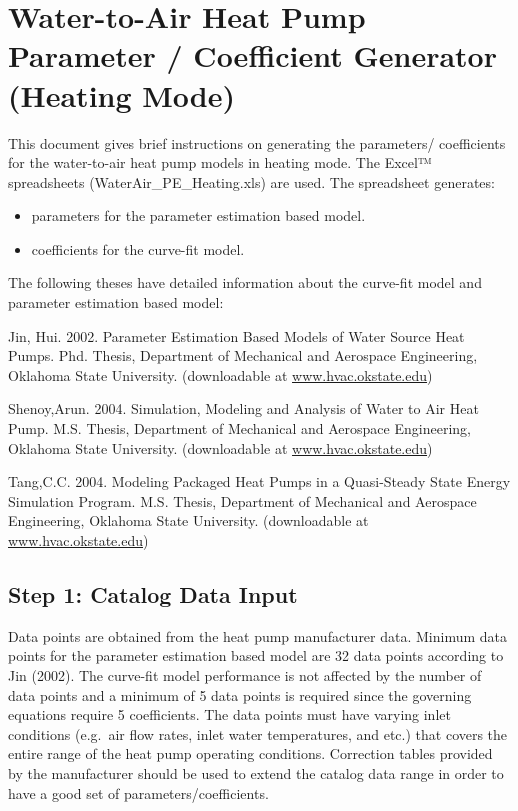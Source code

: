 \section{Water-to-Air Heat Pump Parameter / Coefficient Generator (Heating Mode)}\label{water-to-air-heat-pump-parameter-coefficient-generator-heating-mode}

This document gives brief instructions on generating the parameters/ coefficients for the water-to-air heat pump models in heating mode. The Excel™ spreadsheets (WaterAir\_PE\_Heating.xls) are used. The spreadsheet generates:

\begin{itemize}
\item
  parameters for the parameter estimation based model.
\item
  coefficients for the curve-fit model.
\end{itemize}

The following theses have detailed information about the curve-fit model and parameter estimation based model:

Jin, Hui. 2002. Parameter Estimation Based Models of Water Source Heat Pumps. Phd. Thesis, Department of Mechanical and Aerospace Engineering, Oklahoma State University. (downloadable at \href{http://www.hvac.okstate.edu}{www.hvac.okstate.edu})

Shenoy,Arun. 2004. Simulation, Modeling and Analysis of Water to Air Heat Pump. M.S. Thesis, Department of Mechanical and Aerospace Engineering, Oklahoma State University. (downloadable at \href{http://www.hvac.okstate.edu}{www.hvac.okstate.edu})

Tang,C.C. 2004. Modeling Packaged Heat Pumps in a Quasi-Steady State Energy Simulation Program. M.S. Thesis, Department of Mechanical and Aerospace Engineering, Oklahoma State University. (downloadable at \href{http://www.hvac.okstate.edu}{www.hvac.okstate.edu})

\subsection{Step 1: Catalog Data Input}\label{step-1-catalog-data-input}

Data points are obtained from the heat pump manufacturer data. Minimum data points for the parameter estimation based model are 32 data points according to Jin (2002). The curve-fit model performance is not affected by the number of data points and a minimum of 5 data points is required since the governing equations require 5 coefficients. The data points must have varying inlet conditions (e.g.~air flow rates, inlet water temperatures, and etc.) that covers the entire range of the heat pump operating conditions. Correction tables provided by the manufacturer should be used to extend the catalog data range in order to have a good set of parameters/coefficients.

